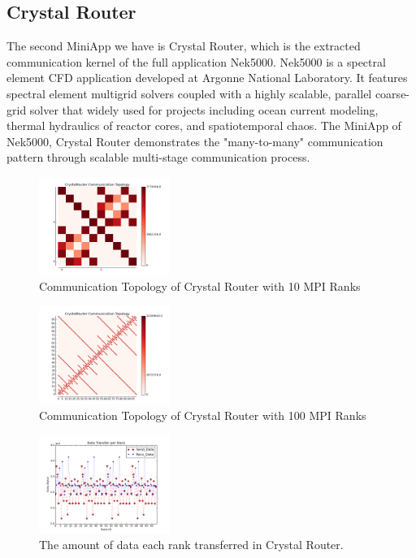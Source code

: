 \documentclass[conference]{IEEEtran}
\begin{document}
\subsection{Crystal Router}
\label{sec:crystalrouter}

The second MiniApp we have is Crystal Router, which is the extracted communication kernel of the full application Nek5000. Nek5000\cite{crystalrouter} is a spectral element CFD application developed at Argonne National Laboratory. It features spectral element multigrid solvers coupled with a highly scalable, parallel coarse-grid solver that widely used for projects including ocean current modeling, thermal hydraulics of reactor cores, and spatiotemporal chaos. The MiniApp of Nek5000, Crystal Router demonstrates the "many-to-many" communication pattern through scalable multi-stage communication process.

\begin{figure}[h!] 
  \centering
  \includegraphics[width=0.38\textwidth]{figs/appstudy/cr/cr10_ct}
   \caption{Communication Topology of Crystal Router with 10 MPI Ranks }
   \label{fig: crystalrouter10 communication topology}
\end{figure}

\begin{figure}[h!] 
  \centering
  \includegraphics[width=0.38\textwidth]{figs/appstudy/cr/cr100_ct}
   \caption{Communication Topology of Crystal Router with 100 MPI Ranks }
   \label{fig: crystalrouter100 communication topology}
\end{figure}

\begin{figure}[h!] 
  \centering
  \includegraphics[width=0.38\textwidth]{figs/appstudy/cr/cr_data_transfer}
   \caption{The amount of data each rank transferred in Crystal Router. }
   \label{fig: cr data trans}
\end{figure}
\end{document}
